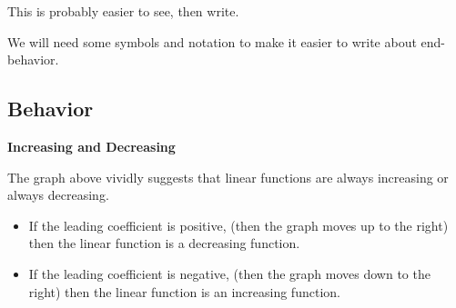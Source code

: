 \documentclass{ximera}
\begin{document}
This is probably easier to see, then write.



\begin{image}
\end{image}


We will need some symbols and notation to make it easier to write about end-behavior. \\




















\subsection*{Behavior}



\textbf{\textcolor{blue!55!black}{Increasing and Decreasing}}






The graph above vividly suggests that linear functions are always increasing or always decreasing.


\begin{itemize}
\item If the leading coefficient is positive, (then the graph moves up to the right) then the linear function is a decreasing function.

\item If the leading coefficient is negative, (then the graph moves down to the right) then the linear function is an increasing function.
\end{itemize}
\end{document}
